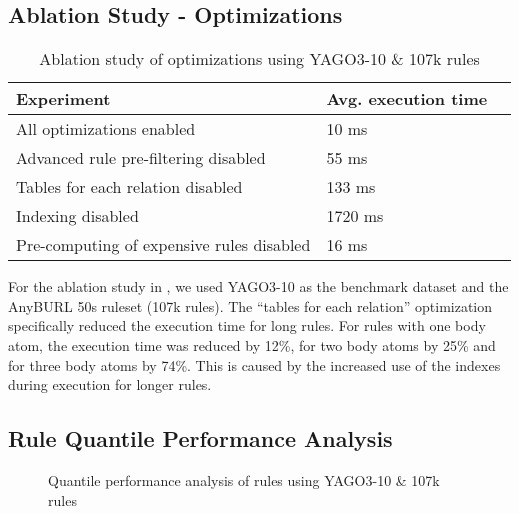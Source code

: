 \documentclass[english]{lni}
\begin{document}
\subsection{Ablation Study - Optimizations} 

\begin{table}[t]
\centering
\begin{tabular}{lll}
\toprule
Experiment & Avg. execution time \\
\midrule
All optimizations enabled & 10 ms\\
\midrule
Advanced rule pre-filtering disabled & 55 ms\\
Tables for each relation disabled & 133 ms\\
Indexing disabled & 1720 ms\\
Pre-computing of expensive rules disabled & 16 ms\\

\bottomrule
\end{tabular}
\caption{Ablation study of optimizations using YAGO3-10 \& 107k rules}
\label{tab:ablation}
\end{table}

For the ablation study in , we used YAGO3-10 as the benchmark dataset and the AnyBURL 50s ruleset (107k rules). The “tables for each relation” optimization specifically reduced the execution time for long rules. For rules with one body atom, the execution time was reduced by 12\%, for two body atoms by 25\% and for three body atoms by 74\%. This is caused by the increased use of the indexes during execution for longer rules.

\subsection{Rule Quantile Performance Analysis} 

\begin{figure}[t]
\caption{Quantile performance analysis of rules using YAGO3-10 \& 107k rules}
\label{fig:quantile-analysis}
\end{figure}
\end{document}
